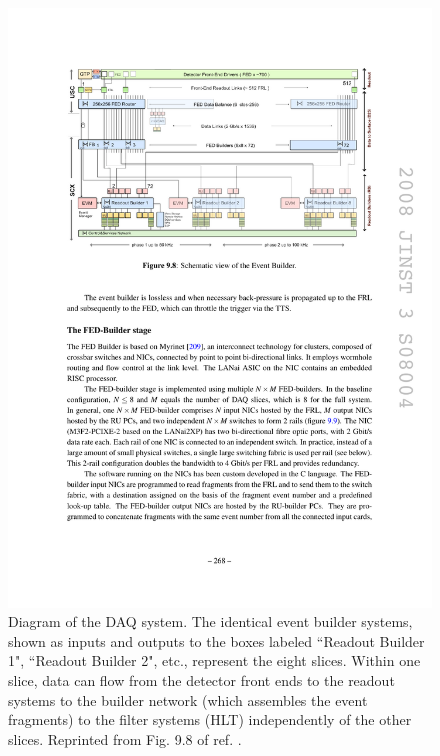 \documentclass[dissertation.tex]{subfiles}
\begin{document}
\begin{figure}
	\centering
	\includegraphics[scale=1.0]{DAQ_overview}
	\caption{Diagram of the DAQ system.  The identical event builder systems, shown as inputs and outputs to the boxes labeled ``Readout Builder 1", ``Readout Builder 2", etc., represent the eight slices.  Within one slice, data can flow from the detector front ends to the readout systems to the builder network (which assembles the event fragments) to the filter systems (HLT) independently of the other slices.  Reprinted from Fig. 9.8 of ref. \cite{CMS_detector_paper}.}
	\label{fig:DAQ_overview}
\end{figure}
\end{document}
